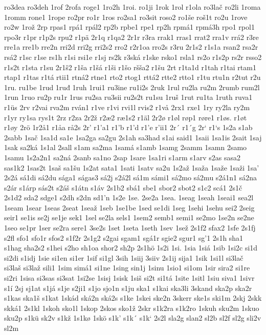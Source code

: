 ro3dea
ro3deh
1rof
2rofa
roge1
1ro2h
1roi.
ro1ji
1rok
1rol
r1ola
ro3lač
ro2li
1roma
1romm
rone1
1rope
ro2pr
ro1r
1ros
ro2sa1
ro3sit
roso2
ro1še
roš1t
ro2u
1rove
ro2w
1rož
2rp
rpas1
rpá1
rpál2
rp2b
rpbe1
rpe1
rp2h
rpmá1
rpmá3h
rpo1
rpol1
rpo3r
r1pr
r1p2s
rpu2
r1pä
2r1q
r1qa2
2r1r
r3ra
rrak1
rras1
rrat2
rra1v
rrá2
r3re
rre1a
rre1b
rre2n
rri2d
rri2g
rri2s2
rro2
r2r1oa
rro2s
r3ru
2r1s2
r1s1a
rsan2
rsa2r
rsá2
r1sc
r1se
rs1h
r1si
rsi1e
r1sj
rs2k
r3ská
r1ske
rsko1
rsla1
rs2o
r1s2p
rs2r
rsso2
r1s2t
r1sta
r1su
2r1š2
r1ša
r1šá
r1ši
r1šo
ršša2
r1šu
2rt
r1ta1d
r1tah
r1tai
rtam1
rtap1
r1tas
r1tá
rtii1
rtná2
rtne1
rto2
rtog1
rttá2
rtte2
rtto1
r1tu
rtu1n
r2tut
r2u
1ru.
ru1be
1rud
1ruđ
1ruh
1rui1
ru3ine
ru1i2s
2ruk
1rul
ru2la
ru2m
2rumb
rum2l
1run
1ruo
ru2p
ru1r
1rus
ru2sa
ru3sii
ru2s2t
ru1su
1ruš
1rut
ru1ta
1ruth
ruva1
r1üs
2rv
r2vai
rva2m
rván1
r1ve
r1vi
rvi1l
rvis2
r1vå
2rx1
rxe1
1ry
ry2la
ry2m
r1yr
ry1sa
rys1t
2rz
r2za
2r2ž
r2æ2
ræ1s2
r1äl
2r2ø
r1øl
røp1
røre1
r1øs.
r1øt
r1øy
2rö
1r2å1
r1åa
rå2s
2r'
r1'a1
r1'b
r1'd
r1'e
r'ii1
2r´
r1´g
2r`
r1`s
1s2a
s1ab
2sabb
1sač
1sa1d
sa1e
1sa2ga
sa2gu
2s1ah
sa3had
s1ai
said1
1saii
1sa1is
2sait
1saj
1sak
sa2ká
1s1al
2sall
s1am
sa2ma
1samá
s1amb
1samg
2samm
1samn
2samo
1samu
1s2a2n1
sa2ná
2sanb
sa1no
2sap
1sare
1sa1ri
s1arm
s1arv
s2as
sasa2
sas1k2
1sas2t
1saš
sa1šu
1s2at
sata1
1sati
1satv
sa2u
1s2až
1saža
1saže
1saži
1sa'
2s2á
sá1di
sá2du
sága1
ságas3
sá2j
s2á2l
sá1m
sámi1
sá2mo
sá2mu
s2á1n1
sá2na
s2ár
s1árp
sás2t
s2áš
s1átn
s1áv
2s1b2
sbá1
sbe1
sbor2
sbot2
s1c2
scá1
2s1č
2s1d2
sda2
sdge1
s2dh
s2dn
sd1'n
1s2e
1se.
2se2a
1sea.
1seag
1seah
1seai1
sea2l
1seam
1sear
1seas
2seat
1seaž
1seb
1se1be
1sed
se1di
1seg
1sehi
1sehu
sei2
2seig
seir1
se1is
se2j
se1je
sek1
1sel
se2la
sels1
1sem2
semb1
semi1
se2mo
1se2n
se2ne
1seo
se1pr
1ser
se2ra
sere1
3se2s
1set
1seta
1seth
1sev
1sež
2s1f2
sfax2
1sfe
2s1fj
s2fl
sfo1
sfo1r
sfos2
s1f2r
2s1g2
s2gai
sgam1
sgá1r
sgie2
sgur1
sg'1
2s1h
sha1
s1hag
sha2s2
s1hei
s2ho
sh1oa
shor2
sh2p
2s1hö
1s2i
1si.
1sia
1siá
1sib
1si2c
si1d
si2di
s1idj
1sie
si1en
si1er
1sif
si1gl
3sih
1siij
3siiv
2s1ij
sija1
1sik
1si1l
si3lač
si3laš
si3laž
sili1
1sim
simá1
si1ne
1sing
sin1j
1sinu
1sio1
si1om
1sir
sira2
si1re
si2ri
1sisa
si3sas
si3sat
1si2se
1sisj
1sisk
1siš
si2t
si1tá
1site
1sitl
1siu
siva1
1sivr
s1í
2sj
sj1at
s1já
s1je
s2ji1
s1jo
sjo1n
s1ju
ska1
s1kai
ska3li
3skand
ska2p
ska2r
s1kas
ska1š
s1kat
1skád
ská2n
ská2s
s1ke
1skei
ske2n
3skerr
ske1s
ski1m
2skj
2skk
skká1
2s1kl
1skoh
sko1l
1skop
2skos
sko1ž
2skr
s1k2ra
s1k2ro
1skuh
sku2m
1skuo
sku2p
s1kü
sk2v
s1kž
1s1kø
1skö
s1k'
s1k´
s1k`
2s2l
sla2g
slan2
sl2b
sl2f
sl2g
sli2v
sl2m
